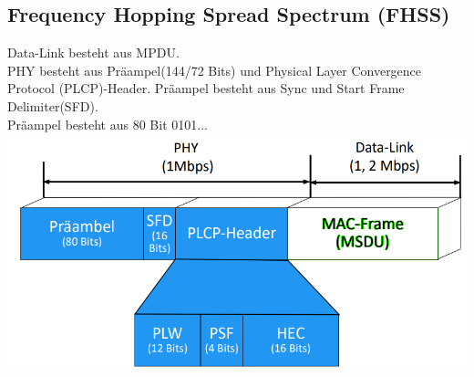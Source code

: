 \documentclass[12pt,a4paper]{article}
\begin{document}
	\subsection{Frequency Hopping Spread Spectrum (FHSS)}
	Data-Link besteht aus MPDU.\\
	PHY besteht aus Präampel(144/72 Bits) und Physical Layer Convergence Protocol (PLCP)-Header.
	Präampel besteht aus Sync und Start Frame Delimiter(SFD).\\
	Präampel besteht aus 80 Bit 0101...\\
	\includegraphics[scale=0.6]{Bilder/FHSSFrame-removedBg.png}
\end{document}
